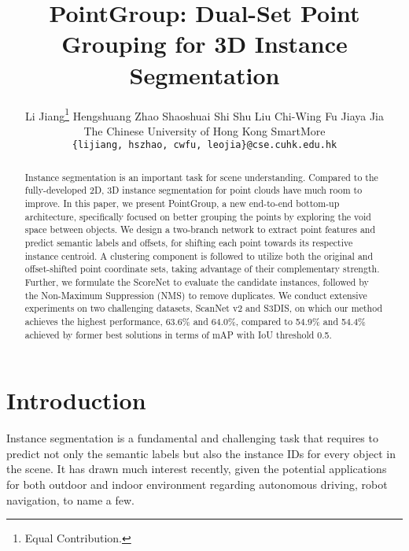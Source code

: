 \documentclass[10pt,twocolumn,letterpaper]{article}
\begin{document}
\title{PointGroup: Dual-Set Point Grouping for 3D Instance Segmentation} 

\author{Li Jiang\thanks{Equal Contribution.} \quad Hengshuang Zhao \quad Shaoshuai Shi \quad Shu Liu \quad Chi-Wing Fu \quad Jiaya Jia\\
	The Chinese University of Hong Kong \quad SmartMore\\
	{\tt\small \{lijiang, hszhao, cwfu, leojia\}@cse.cuhk.edu.hk}   
}


\maketitle


\begin{abstract}
Instance segmentation is an important task for scene understanding. Compared to the fully-developed 2D, 3D instance segmentation for point clouds have much room to improve.
In this paper, we present PointGroup, a new end-to-end bottom-up architecture, specifically focused on better grouping the points by exploring the void space between objects. We design a two-branch network to extract point features and predict semantic labels and offsets, for shifting each point towards its respective instance centroid. A clustering component is  followed to utilize both the original and offset-shifted point coordinate sets, taking advantage of their complementary strength. Further, we formulate the ScoreNet to evaluate the candidate instances, followed by the Non-Maximum Suppression (NMS) to remove duplicates.
We conduct extensive experiments on two challenging datasets, ScanNet v2 and S3DIS, on which our method achieves the highest performance, 63.6\% and 64.0\%, compared to 54.9\% and 54.4\% achieved by former best solutions in terms of mAP with IoU threshold 0.5.
\end{abstract}


\section{Introduction}

Instance segmentation is a fundamental and challenging task that requires to predict not only the semantic labels but also the instance IDs for every object in the scene. It has drawn much interest recently, given the potential applications for both outdoor and indoor environment regarding autonomous driving, robot navigation, to name a few.
\end{document}
